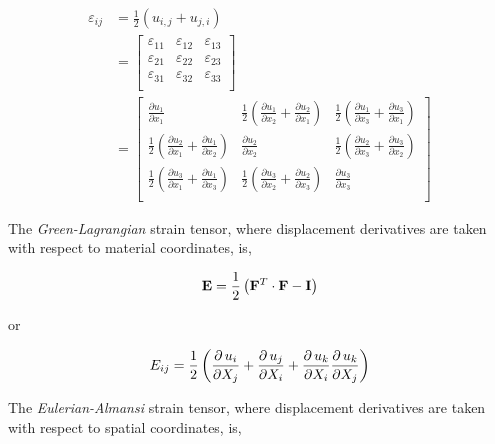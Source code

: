\documentclass{InsightArticle}
\begin{document}
\begin{equation}
\begin{aligned}
\varepsilon_{ij} &= \frac{1}{2}\left(u_{i,j}+u_{j,i}\right)  \\
&=
\left[\begin{matrix}
\varepsilon_{11} & \varepsilon_{12} & \varepsilon_{13} \\
   \varepsilon_{21} & \varepsilon_{22} & \varepsilon_{23} \\
   \varepsilon_{31} & \varepsilon_{32} & \varepsilon_{33} \\
  \end{matrix}\right] \\
&=
\left[\begin{matrix}
  \frac{\partial u_1}{\partial x_1} & \frac{1}{2} \left(\frac{\partial u_1}{\partial x_2}+\frac{\partial u_2}{\partial x_1}\right) & \frac{1}{2} \left(\frac{\partial u_1}{\partial x_3}+\frac{\partial u_3}{\partial x_1}\right) \\
   \frac{1}{2} \left(\frac{\partial u_2}{\partial x_1}+\frac{\partial u_1}{\partial x_2}\right) & \frac{\partial u_2}{\partial x_2} & \frac{1}{2} \left(\frac{\partial u_2}{\partial x_3}+\frac{\partial u_3}{\partial x_2}\right) \\
   \frac{1}{2} \left(\frac{\partial u_3}{\partial x_1}+\frac{\partial u_1}{\partial x_3}\right) & \frac{1}{2} \left(\frac{\partial u_3}{\partial x_2}+\frac{\partial u_2}{\partial x_3}\right) & \frac{\partial u_3}{\partial x_3} \\
  \end{matrix}\right]
\end{aligned}
\end{equation}

The \textit{Green-Lagrangian} strain tensor, where displacement derivatives are
taken with respect to material coordinates, is,

\begin{equation}
\mathbf{E} = {1 \over 2} \left( \mathbf{F}^T \cdot \mathbf{F} - \mathbf{I} \right)
\end{equation}

or

\begin{equation}
E_{ij} = {1 \over 2} \left( {\partial \, u_i \over \partial X_j} + {\partial \, u_j \over \partial X_i} +
                         {\partial \, u_k \over \partial X_i} {\partial \, u_k \over \partial X_j} \right)
\end{equation}

The \textit{Eulerian-Almansi} strain tensor, where displacement derivatives are
taken with respect to spatial coordinates, is,
\end{document}

